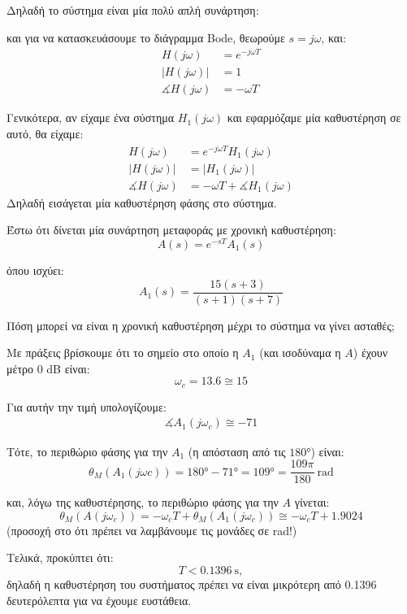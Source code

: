 \documentclass[11pt,a4paper,notitlepage,fleqn]{article}
\begin{document}
Δηλαδή το σύστημα είναι μία πολύ απλή συνάρτηση:


και για να κατασκευάσουμε το διάγραμμα Bode, θεωρούμε \( s=j\omega \),
και:
\begin{align*}
	H(j\omega) &= e^{-j\omega T}
	\\
	\left\lvert H(j\omega) \right\rvert &= 1 \\
	\measuredangle H(j\omega) &= - \omega T
\end{align*}

Γενικότερα, αν είχαμε ένα σύστημα \( H_1(j\omega) \) και εφαρμόζαμε
μία καθυστέρηση σε αυτό, θα είχαμε:
\begin{align*}
	H(j\omega) &= e^{-j\omega T} H_1(j\omega) \\
	\left\lvert H(j\omega) \right\rvert &= \left\lvert H_1(j\omega)
	\right\rvert \\
	\measuredangle H(j\omega) &= -\omega T + \measuredangle H_1(j\omega)
\end{align*}
Δηλαδή εισάγεται μία καθυστέρηση φάσης στο σύστημα.


\begin{exercise}[Παράδειγμα]
Έστω ότι δίνεται μία συνάρτηση μεταφοράς με χρονική καθυστέρηση:
\[
A(s) = e^{-sT} A_1(s)
\]

όπου ισχύει:
\[
A_1(s) = \frac{15(s+3)}{(s+1)(s+7)}
\]

Πόση μπορεί να είναι η χρονική καθυστέρηση μέχρι το σύστημα
να γίνει ασταθές;

\tcblower
{}
Με πράξεις βρίσκουμε ότι το σημείο στο οποίο η \( A_1 \) (και
ισοδύναμα η \( A \)) έχουν μέτρο 0 dB είναι:
\[
\omega_c = 13.6 \cong 15
\]

Για αυτήν την τιμή υπολογίζουμε:
\begin{align*}
	\measuredangle A_1(j\omega_c) \cong -71
\end{align*}

Τότε, το περιθώριο φάσης
για την \( A_1 \) (η απόσταση από τις \( \ang{180} \)) είναι:
\[
\theta_M\left( A_1(j\omega c) \right)
= \ang{180} - \ang{71} = \ang{109}
= \frac{109π}{180} \ \mathrm{rad}
\]

και, λόγω της καθυστέρησης, το περιθώριο φάσης για την \( A \)
γίνεται:
\[
\theta_M\left( A(j\omega_c) \right)
= -\omega_c T + \theta_M \left( A_1(j\omega_c) \right)
\cong -\omega_c T + 1.9024
\]
(προσοχή στο ότι πρέπει να λαμβάνουμε τις μονάδες σε rad!)

Τελικά, προκύπτει ότι:
\[
T < \SI{0.1396}{\second},
\]
δηλαδή η καθυστέρηση του συστήματος πρέπει να είναι μικρότερη από
0.1396 δευτερόλεπτα για να έχουμε ευστάθεια.

\end{exercise}
\end{document}

